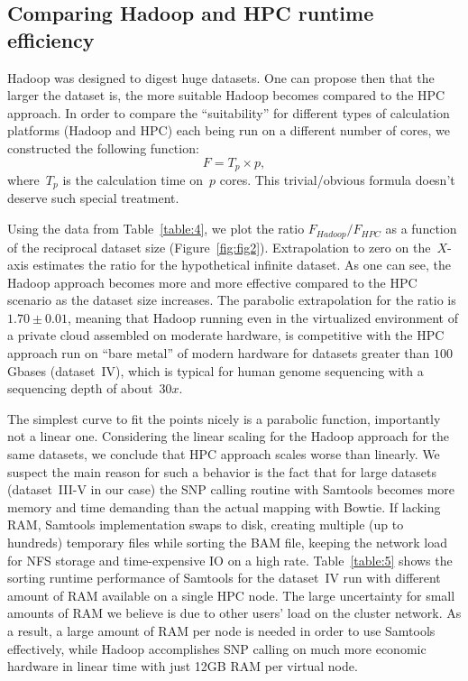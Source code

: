 \documentclass[11pt, oneside]{article}   	%
\newcommand{\COMMENT}[1]{{\color{red} #1 }}
\begin{document}
\subsection{Comparing Hadoop and HPC runtime efficiency}
Hadoop was designed to digest huge datasets\cite{hadoop,lin2010}. One can propose then that the larger the dataset is, the more suitable Hadoop becomes compared to the HPC approach. In order to compare the ``suitability'' for different types of calculation platforms (Hadoop and HPC) each being run on a different number of cores, we constructed the following function:
$$F=T_{p}\times p,$$ 
where~$T_{p}$ is the calculation time on~$p$ cores. \COMMENT{This trivial/obvious formula doesn't deserve such special treatment.}

Using the data from Table~\ref{table:4}, we plot the ratio $F_{Hadoop}/F_{HPC}$ as a function of the reciprocal dataset size (Figure~\ref{fig:fig2}). Extrapolation to zero on the~$X$-axis estimates the ratio for the hypothetical infinite dataset. As one can see, the Hadoop approach becomes more and more effective compared to the HPC scenario as the dataset size increases. 
The parabolic extrapolation for the ratio is $1.70\pm0.01$, meaning that Hadoop running even in the virtualized environment of a private cloud assembled on moderate hardware, is competitive with the HPC approach run on ``bare metal'' of modern hardware for datasets greater than $100$\,Gbases (dataset~IV), which is typical for human genome sequencing with a sequencing depth of about~$30x$.


The simplest curve to fit the points nicely is a parabolic function, importantly not a linear one. Considering the linear scaling for the Hadoop approach for the same datasets, we conclude that HPC approach scales worse than linearly.
We suspect the main reason for such a behavior is the fact that for large datasets (dataset~III-V in our case) the SNP calling routine with Samtools becomes more memory and time demanding than the actual mapping with Bowtie.
If lacking RAM, Samtools implementation swaps to disk, creating multiple (up to hundreds) temporary files while sorting the BAM file, keeping the network load for NFS storage and time-expensive IO on a high rate.
Table~\ref{table:5} shows the sorting runtime performance of Samtools for the dataset~IV run with different amount of RAM available on a single HPC node. The large uncertainty for small amounts of RAM we believe is due to other users' load on the cluster network. As a result, a large amount of RAM per node is needed in order to use Samtools effectively, while Hadoop accomplishes SNP calling on much more economic hardware in linear time with just 12GB RAM per virtual node.
\end{document}
